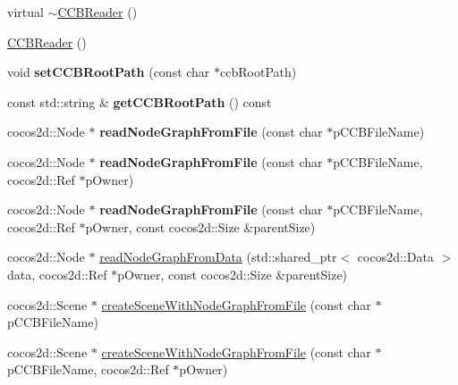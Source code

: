 \begin{DoxyCompactItemize}
\item 
virtual \hyperlink{classcocosbuilder_1_1CCBReader_a6d8533867b40e91c6fdbf5eeb48923df}{$\sim$\+C\+C\+B\+Reader} ()
\item 
\hyperlink{classcocosbuilder_1_1CCBReader_ad400ef028022055a1e3a31aeb024c822}{C\+C\+B\+Reader} ()
\item 
\mbox{\label{classcocosbuilder_1_1CCBReader_a6d2c6fd1be3413b8b68b00bc2824259c}} 
void {\bfseries set\+C\+C\+B\+Root\+Path} (const char $\ast$ccb\+Root\+Path)
\item 
\mbox{\label{classcocosbuilder_1_1CCBReader_aa06e154edc595145cde2ed8eb8e0c26a}} 
const std\+::string \& {\bfseries get\+C\+C\+B\+Root\+Path} () const
\item 
\mbox{\label{classcocosbuilder_1_1CCBReader_a6eba7b4b809fb238da9a77366094cee1}} 
cocos2d\+::\+Node $\ast$ {\bfseries read\+Node\+Graph\+From\+File} (const char $\ast$p\+C\+C\+B\+File\+Name)
\item 
\mbox{\label{classcocosbuilder_1_1CCBReader_a3088902b761d31718592f074975d26a6}} 
cocos2d\+::\+Node $\ast$ {\bfseries read\+Node\+Graph\+From\+File} (const char $\ast$p\+C\+C\+B\+File\+Name, cocos2d\+::\+Ref $\ast$p\+Owner)
\item 
\mbox{\label{classcocosbuilder_1_1CCBReader_a26d992f27d4cdf423211c897c835e06f}} 
cocos2d\+::\+Node $\ast$ {\bfseries read\+Node\+Graph\+From\+File} (const char $\ast$p\+C\+C\+B\+File\+Name, cocos2d\+::\+Ref $\ast$p\+Owner, const cocos2d\+::\+Size \&parent\+Size)
\item 
cocos2d\+::\+Node $\ast$ \hyperlink{classcocosbuilder_1_1CCBReader_afcc34580625ae0cecaf2c00a5607df89}{read\+Node\+Graph\+From\+Data} (std\+::shared\+\_\+ptr$<$ cocos2d\+::\+Data $>$ data, cocos2d\+::\+Ref $\ast$p\+Owner, const cocos2d\+::\+Size \&parent\+Size)
\item 
cocos2d\+::\+Scene $\ast$ \hyperlink{classcocosbuilder_1_1CCBReader_ad9c7b2117ef4ff7dd2061fed497797f0}{create\+Scene\+With\+Node\+Graph\+From\+File} (const char $\ast$p\+C\+C\+B\+File\+Name)
\item 
cocos2d\+::\+Scene $\ast$ \hyperlink{classcocosbuilder_1_1CCBReader_a444763073132b72f51c051c63e1adfcb}{create\+Scene\+With\+Node\+Graph\+From\+File} (const char $\ast$p\+C\+C\+B\+File\+Name, cocos2d\+::\+Ref $\ast$p\+Owner)

\end{DoxyCompactItemize}
